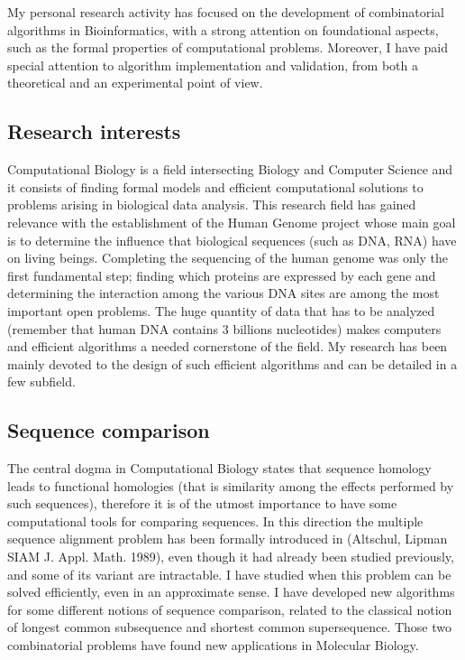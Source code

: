 \documentclass[11pt,a4paper,roman]{moderncv}
\begin{document}
My personal research activity has focused on the development of combinatorial algorithms in Bioinformatics, with a strong attention on foundational aspects, such as the formal properties of computational problems. Moreover, I have paid special attention to algorithm implementation and validation, from both a theoretical and an experimental point of view.


\subsection{Research interests}

Computational Biology is a field intersecting Biology and Computer
Science and it consists of finding formal models and efficient
computational solutions to problems arising in biological data analysis.
This research field has gained relevance with the establishment of the
Human Genome project whose main goal is to determine the influence that
biological sequences (such as DNA, RNA) have on living beings.
Completing the sequencing of the human genome was only the first
fundamental step; finding which proteins are expressed by each gene and
determining the interaction among the various DNA sites are among the
most important open problems. The huge quantity of data that has to be
analyzed (remember that human DNA contains 3 billions nucleotides) makes
computers and efficient algorithms a needed cornerstone of the field.
My research has been mainly devoted to the design of such
efficient algorithms and can be detailed in a few subfield.

\subsection{Sequence comparison}\label{sequence-comparison}

The central dogma in Computational Biology states that sequence homology
leads to functional homologies (that is similarity among the effects
performed by such sequences), therefore it is of the utmost importance
to have some computational tools for comparing sequences. In this
direction the multiple sequence alignment problem has been formally
introduced in (Altschul, Lipman SIAM J. Appl. Math. 1989), even though
it had already been studied previously, and some of its variant are
intractable. I have studied when this problem can be solved efficiently,
even in an approximate sense. I have developed new algorithms for some
different notions of sequence comparison, related to the classical
notion of longest common subsequence and shortest common supersequence.
Those two combinatorial problems have found new applications in
Molecular Biology.
\end{document}
